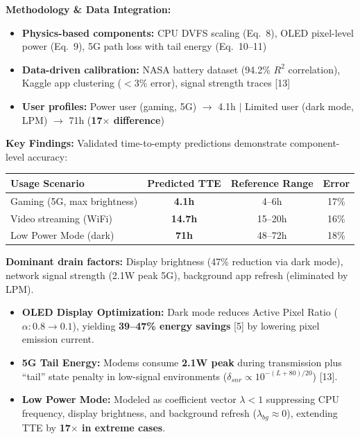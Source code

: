 \documentclass[12pt]{article}
\begin{document}
\noindent\textbf{Methodology \& Data Integration:}
\begin{itemize}[nosep]
\item \textbf{Physics-based components:} CPU DVFS scaling (Eq.~8), OLED pixel-level power (Eq.~9), 5G path loss with tail energy (Eq.~10--11)
\item \textbf{Data-driven calibration:} NASA battery dataset (94.2\% $R^2$ correlation), Kaggle app clustering ($<$3\% error), signal strength traces [13]
\item \textbf{User profiles:} Power user (gaming, 5G) $\rightarrow$ 4.1h $\vert$ Limited user (dark mode, LPM) $\rightarrow$ 71h (\textbf{17$\times$ difference})
\end{itemize}

\noindent\textbf{Key Findings:}
Validated time-to-empty predictions demonstrate component-level accuracy:

\vspace{1ex}
\begin{center}
\begin{tabular}{lccc}
\toprule
\textbf{Usage Scenario} & \textbf{Predicted TTE} & \textbf{Reference Range} & \textbf{Error} \\
\midrule
Gaming (5G, max brightness) & \textbf{4.1h} & 4--6h & 17\% \\
Video streaming (WiFi) & \textbf{14.7h} & 15--20h & 16\% \\
Low Power Mode (dark) & \textbf{71h} & 48--72h & 18\% \\
\bottomrule
\end{tabular}
\end{center}
\vspace{1ex}

\noindent\textbf{Dominant drain factors:} Display brightness (47\% reduction via dark mode), network signal strength (2.1W peak 5G), background app refresh (eliminated by LPM).

\begin{itemize}[nosep]
\item \textbf{OLED Display Optimization:} Dark mode reduces Active Pixel Ratio ($\alpha \colon 0.8 \rightarrow 0.1$), yielding \textbf{39--47\% energy savings} [5] by lowering pixel emission current.

\item \textbf{5G Tail Energy:} Modems consume \textbf{2.1W peak} during transmission plus ``tail'' state penalty in low-signal environments ($\delta_{snr} \propto 10^{-(L+80)/20}$) [13].

\item \textbf{Low Power Mode:} Modeled as coefficient vector $\lambda < 1$ suppressing CPU frequency, display brightness, and background refresh ($\lambda_{bg} \approx 0$), extending TTE by \textbf{17$\times$ in extreme cases}.
\end{itemize}
\end{document}
